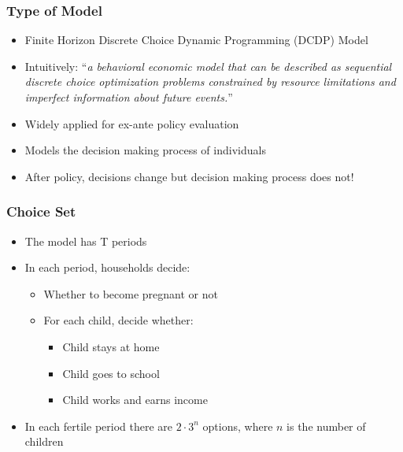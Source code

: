 \documentclass[11pt]{beamer}
\begin{document}
\begin{frame}[c]\frametitle{Type of Model}
    \begin{itemize}
        \item Finite Horizon \alert{Discrete Choice Dynamic Programming} (DCDP) Model
        \item \alert{Intuitively}: ``\textit{\small{a behavioral economic model that can be described as sequential discrete choice optimization problems constrained by resource limitations and imperfect information about future events.}}''
        \item Widely applied for ex-ante policy evaluation
        \item Models the decision making process of individuals
        \item After policy, decisions change but decision making process does not!
    \end{itemize}
\end{frame}



\begin{frame}[c]\frametitle{Choice Set}
    \begin{itemize}
        \item The model has T periods
        \item In each period, households decide:
        \begin{itemize}
            \item Whether to become pregnant or not
            \item For each child, decide whether:
            \begin{itemize}
                \item Child stays at home
                \item Child goes to school
                \item Child works and earns income
            \end{itemize}
        \end{itemize}
        \item In each fertile period there are $2 \cdot 3^{n}$ options, where $n$ is the number of children
    \end{itemize}
\end{frame}
\end{document}
